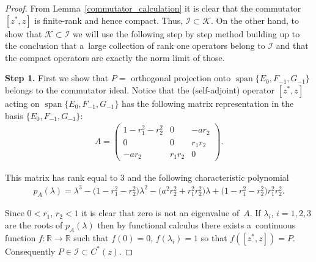 \documentclass[pdftex]{sigma}
\numberwithin{equation}{section}
\begin{document}
\begin{proof}
From Lemma~\ref{commutator_calculation} it is clear that the commutator $[z^*, z]$ is f\/inite-rank and hence compact.
Thus, $\mathcal I \subset \mathcal K$.
On the other hand, to show that $\mathcal K \subset \mathcal I$ we will use the following step by step method building
up to the conclusion that a~large collection of rank one operators belong to $\mathcal I$ and that the compact operators
are exactly the norm limit of those.

{\bf Step 1.} First we show that $P=$ orthogonal projection onto $\operatorname{span}\{E_0, F_{-1}, G_{-1}\}$ belongs to the commutator
ideal.
Notice that the (self-adjoint) operator $[z^*{,} z]$ acting on $\operatorname{span}\{E_0, F_{{-}1}, G_{{-}1}\}$ has the following matrix
representation in the basis $\{E_0, F_{-1}, G_{-1}\}$:
\begin{gather*}
A= \left(
\begin{matrix}
1-r_1^2-r_2^2 & 0 & -ar_2
\\
0 & 0 & r_1r_2
\\
-ar_2 & r_1r_2 & 0
\end{matrix}
\right).
\end{gather*}

This matrix has rank equal to $3$ and the following characteristic polynomial
\begin{gather*}
p_A(\lambda)=\lambda^3-\big(1-r_1^2-r_2^2\big)\lambda^2-\big(a^2r_2^2+r_1^2r_2^2\big)\lambda+\big(1-r_1^2-r_2^2\big)r_1^2r_2^2.
\end{gather*}

Since $0 < r_1$, $r_2 < 1$ it is clear that zero is not an eigenvalue of~$A$.
If $\lambda_i$, $i=1,2,3$ are the roots of $p_A(\lambda)$ then by functional calculus there exists a~continuous function
$f: \mathbb R \to \mathbb R$ such that $f(0)=0$, $f(\lambda_i)=1$ so that $f([z^*,z])=P$.
Consequently $P \in \mathcal I \subset C^*(z)$.


\end{proof}
\end{document}

